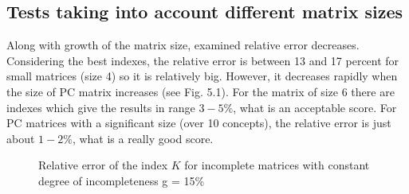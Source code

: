 \subsection{Tests taking into account different matrix sizes}
Along with growth of the matrix size, examined relative error decreases. Considering the best indexes, the relative error is between 13 and 17 percent for small matrices (size 4) so it is relatively big. However, it decreases rapidly when the size of PC matrix increases (see Fig. 5.1). For the matrix of size 6 there are indexes which give the results in range $3 - 5 \%$, what is an acceptable score. For PC matrices with a significant size (over 10 concepts), the relative error is just about $1 - 2 \%$, what is a really good score.





\begin{figure}[]
  \begin{center}
\caption{Relative error of the index $K$ for incomplete matrices with constant degree of incompleteness g = 15\%}
\end{center}
\end{figure}


